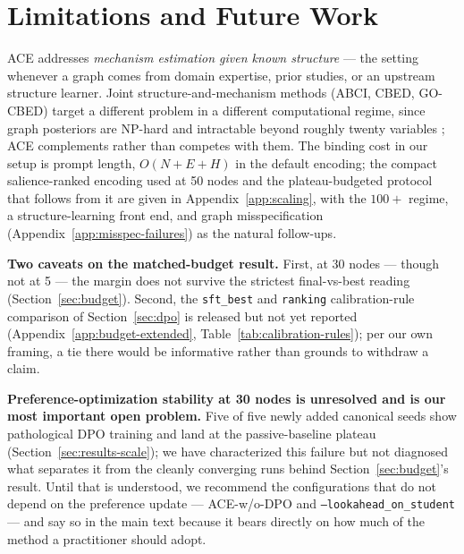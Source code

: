 \documentclass[twoside]{article}
\theoremstyle{plain}
\theoremstyle{definition}
\theoremstyle{remark}
\begin{document}
\section{Limitations and Future Work}

\label{sec:limitations}
ACE addresses \emph{mechanism estimation given known structure} --- the setting whenever a graph comes from domain expertise, prior studies, or an upstream structure learner. Joint structure-and-mechanism methods (ABCI, CBED, GO-CBED) target a different problem in a different computational regime, since graph posteriors are NP-hard \citep{chickering1996learning} and intractable beyond roughly twenty variables \citep{zhou2024sample}; ACE complements rather than competes with them. The binding cost in our setup is prompt length, $O(N\!+\!E\!+\!H)$ in the default encoding; the compact salience-ranked encoding used at 50 nodes and the plateau-budgeted protocol that follows from it are given in Appendix~\ref{app:scaling}, with the $100+$ regime, a structure-learning front end, and graph misspecification (Appendix~\ref{app:misspec-failures}) as the natural follow-ups.

\textbf{Two caveats on the matched-budget result.} First, at 30 nodes --- though not at 5 --- the margin does not survive the strictest final-vs-best reading (Section~\ref{sec:budget}). Second, the \texttt{sft\_best} and \texttt{ranking} calibration-rule comparison of Section~\ref{sec:dpo} is released but not yet reported (Appendix~\ref{app:budget-extended}, Table~\ref{tab:calibration-rules}); per our own framing, a tie there would be informative rather than grounds to withdraw a claim.

\textbf{Preference-optimization stability at 30 nodes is unresolved and is our most important open problem.} Five of five newly added canonical seeds show pathological DPO training and land at the passive-baseline plateau (Section~\ref{sec:results-scale}); we have characterized this failure but not diagnosed what separates it from the cleanly converging runs behind Section~\ref{sec:budget}'s result. Until that is understood, we recommend the configurations that do not depend on the preference update --- ACE-w/o-DPO and \texttt{--lookahead\_on\_student} --- and say so in the main text because it bears directly on how much of the method a practitioner should adopt.

\end{document}
